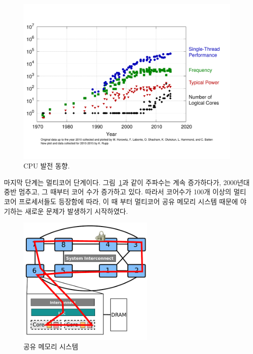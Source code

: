 \begin{figure}[h!]
  \begin{center}
    \includegraphics[scale=0.3]{fig/cpu}
  \end{center}
  \caption{CPU 발전 동향.}
  \label{fig:aim7}
\end{figure}

마지막 단계는 멀티코어 단계이다.
그림~\ref{fig:aim7}과 같이 주파수는 계속 증가하다가, 2000년대 중반 멈추고, 그 때부터 코어 수가 증가하고 있다. 
따라서 코어수가 100개 이상의 멀티코어 프로세서들도 등장함에 따라, 이 때 부터 멀티코어 공유 
메모리 시스템 때문에 야기하는 새로운 문제가 발생하기 시작하였다.

\begin{figure}[h!]
    \centering
    \includegraphics[width=0.6\textwidth]{fig/archcache}
    \caption{공유 메모리 시스템}
  \label{shared_memory}
\end{figure}

